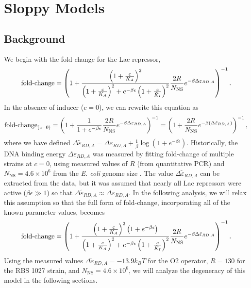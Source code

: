 \pagebreak
\phantom{...}
\pagebreak
\section{Sloppy Models} \label{AppendixSloppiness}

\subsection{Background}

We begin with the fold-change for the Lac repressor,
\begin{equation}
\operatorname{fold-change}= \left(
1+\frac{\left(1+\frac{c}{K_A}\right)^2}{\left(1+\frac{c}{K_A}\right)^2+e^{-\beta \epsilon}\left(1 + \frac{c}{\tilde{K}_I}\right)^2}\frac{2 R}{N_{\text{NS}}}e^{-\beta \Delta\varepsilon_{RD,A}} \right)^{-1}.
\end{equation}
In the absence of inducer ($c = 0$), we can rewrite this equation as
\begin{equation}
\operatorname{fold-change}_{(c=0)}= \left(
1+\frac{1}{1+e^{-\beta \epsilon}}\frac{2 R}{N_{\text{NS}}}e^{-\beta \Delta\varepsilon_{RD,A}} \right)^{-1} = \left(
1+\frac{2 R}{N_{\text{NS}}}e^{-\beta \left( \Delta\tilde{\varepsilon}_{RD,A} \right) } \right)^{-1},
\end{equation}
where we have defined $\Delta\tilde{\varepsilon}_{RD,A} = \Delta\varepsilon_{RD,A} + \frac{1}{\beta} \log \left( 1 + e^{-\beta \epsilon} \right) $. Historically, the DNA binding energy $\Delta\varepsilon_{RD,A}$ was measured by fitting fold-change of multiple strains at $c = 0$, using measured values of $R$ (from quantitative PCR) and $N_{\text{NS}} = 4.6
\times 10^6$ from the \textit{E. coli} genome size \cite{Garcia2011}. The value $\Delta\tilde{\varepsilon}_{RD,A}$ can be extracted from the data, but it was assumed that nearly all Lac repressors were active ($\beta \epsilon \gg 1$) so that $\Delta\tilde{\varepsilon}_{RD,A} \approx \Delta\varepsilon_{RD,A}$. In the following analysis, we will relax this assumption so that the full form of fold-change, incorporating all of the known parameter values, becomes
\begin{equation} \label{SIFullFoldChangeExpression}
\operatorname{fold-change}= \left(
1+\frac{\left(1+\frac{c}{K_A}\right)^2 \left( 1 + e^{-\beta \epsilon} \right)}{\left(1+\frac{c}{K_A}\right)^2+e^{-\beta \epsilon}\left(1 + \frac{c}{\tilde{K}_I}\right)^2}\frac{2 R}{N_{\text{NS}}}e^{-\beta \Delta\tilde{\varepsilon}_{RD,A}} \right)^{-1}.
\end{equation}
Using the measured values $\Delta\tilde{\varepsilon}_{RD,A} = -13.9 k_B T$ for
the O2 operator, $R=130$ for the RBS 1027 strain, and $N_{\text{NS}} = 4.6
\times 10^6$, we will analyze the degeneracy of this model in the following
sections.

